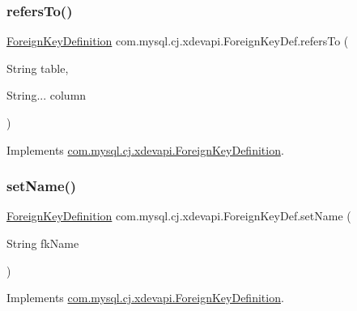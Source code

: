 \subsubsection{\texorpdfstring{refers\+To()}{refersTo()}}
{\footnotesize\ttfamily \mbox{\hyperlink{interfacecom_1_1mysql_1_1cj_1_1xdevapi_1_1_foreign_key_definition}{Foreign\+Key\+Definition}} com.\+mysql.\+cj.\+xdevapi.\+Foreign\+Key\+Def.\+refers\+To (\begin{DoxyParamCaption}\item[{String}]{table,  }\item[{String...}]{column }\end{DoxyParamCaption})}



Implements \mbox{\hyperlink{interfacecom_1_1mysql_1_1cj_1_1xdevapi_1_1_foreign_key_definition_a0d3e1863c4bc69c9b03c8f573bf6bc39}{com.\+mysql.\+cj.\+xdevapi.\+Foreign\+Key\+Definition}}.

\mbox{\label{classcom_1_1mysql_1_1cj_1_1xdevapi_1_1_foreign_key_def_a39b5a6f9c5dc4307b38a87109cd4784d}} 
\subsubsection{\texorpdfstring{set\+Name()}{setName()}}
{\footnotesize\ttfamily \mbox{\hyperlink{interfacecom_1_1mysql_1_1cj_1_1xdevapi_1_1_foreign_key_definition}{Foreign\+Key\+Definition}} com.\+mysql.\+cj.\+xdevapi.\+Foreign\+Key\+Def.\+set\+Name (\begin{DoxyParamCaption}\item[{String}]{fk\+Name }\end{DoxyParamCaption})}



Implements \mbox{\hyperlink{interfacecom_1_1mysql_1_1cj_1_1xdevapi_1_1_foreign_key_definition_a463ad3b32013c0394c4bb428a70fd247}{com.\+mysql.\+cj.\+xdevapi.\+Foreign\+Key\+Definition}}.

\mbox{\label{classcom_1_1mysql_1_1cj_1_1xdevapi_1_1_foreign_key_def_a5b869e38335874c6a693023d4c9ced9a}} 
